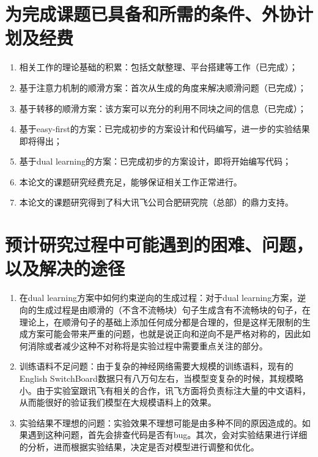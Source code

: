 \section{为完成课题已具备和所需的条件、外协计划及经费}
\begin{enumerate}
	\item 相关工作的理论基础的积累：包括文献整理、平台搭建等工作（已完成）；
	\item 基于注意力机制的顺滑方案：首次从生成的角度来解决顺滑问题（已完成）；
	\item 基于转移的顺滑方案：该方案可以充分的利用不同块之间的信息（已完成）；
	\item 基于easy-first的方案：已完成初步的方案设计和代码编写，进一步的实验结果即将得出；
	\item 基于dual learning的方案：已完成初步的方案设计，即将开始编写代码；
	\item 本论文的课题研究经费充足，能够保证相关工作正常进行。
	\item 本论文的课题研究得到了科大讯飞公司合肥研究院（总部）的鼎力支持。
\end{enumerate}


\section{预计研究过程中可能遇到的困难、问题，以及解决的途径}

\begin{enumerate}
	\item 在dual learning方案中如何约束逆向的生成过程：对于dual learning方案，逆向的生成过程是由顺滑的（不含不流畅块）句子生成含有不流畅块的句子，在理论上，在顺滑句子的基础上添加任何成分都是合理的，但是这样无限制的生成方案可能会带来严重的问题，也就是说正向和逆向不是严格对称的，因此如何消除或者减少这种不对称将是实验过程中需要重点关注的部分。
	\item 训练语料不足问题：由于复杂的神经网络需要大规模的训练语料，现有的English SwitchBoard数据只有八万句左右，当模型变复杂的时候，其规模略小。由于实验室跟讯飞有相关的合作，讯飞方面将负责标注大量的中文语料，从而能很好的验证我们模型在大规模语料上的效果。
	\item 实验结果不理想的问题：实验效果不理想可能是由多种不同的原因造成的。如果遇到这种问题，首先会排查代码是否有bug。其次，会对实验结果进行详细的分析，进而根据实验结果，决定是否对模型进行调整和优化。
\end{enumerate}


